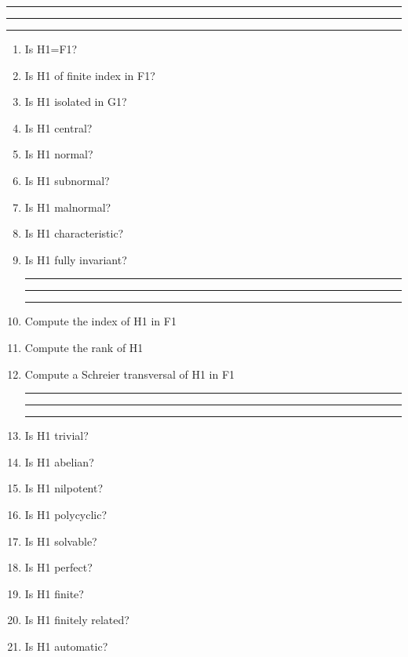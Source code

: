 
\bigskip
\hrule\hrule\hrule

\begin{enumerate}

\item Is H1=F1?

\item Is H1 of finite index in F1?

\item Is H1 isolated in G1?

\item Is H1 central?

\item Is H1 normal?

\item Is H1 subnormal?

\item Is H1 malnormal?

\item Is H1 characteristic?

\item Is H1 fully invariant?

\bigskip
\hrule\hrule\hrule

\item Compute the index of H1 in F1

\item Compute the rank of H1

\item Compute a Schreier transversal of H1 in F1

\bigskip
\hrule\hrule\hrule

\item Is H1 trivial?

\item Is H1 abelian?

\item Is H1 nilpotent?

\item Is H1 polycyclic?

\item Is H1 solvable?

\item Is H1 perfect?

\item Is H1 finite?

\item Is H1 finitely related?

\item Is H1 automatic?


\end{enumerate}
